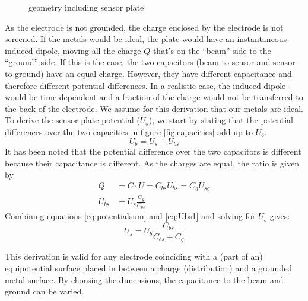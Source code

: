 \begin{figure}[ht]
\centering

\caption{geometry including sensor plate}
\label{fig:geofrontview}
\end{figure}

As the electrode is not grounded, the charge enclosed by the electrode is not screened. If the metals would be ideal, the plate would have an instantaneous induced dipole, moving all the charge $Q$ that's on the ``beam''-side to the ``ground'' side. If this is the case, the two capacitors (beam to sensor and sensor to ground) have an equal charge. However, they have different capacitance and therefore different potential differences.
In a realistic case, the induced dipole would be time-dependent and a fraction of the charge would not be transferred to the back of the electrode. We assume for this derivation that our metals are ideal.
To derive the sensor plate potential ($U_s$), we start by stating that the potential differences over the two capacities in figure \ref{fig:capacities} add up to $U_b$.
\begin{equation}
U_b = U_s + U_{bs}
\label{eq:potentialsum}
\end{equation}
It has been noted that the potential difference over the two capacitors is different because their capacitance is different. As the charges are equal, the ratio is given by
\begin{align}
Q &= C\cdot U = C_{bs} U_{bs} = C_g U_{sg} \nonumber \\
U_{bs} &= U_s\frac{C_g}{C_{bs}} \label{eq:Ubs1}
\end{align}
Combining equations \ref{eq:potentialsum} and \ref{eq:Ubs1} and solving for $U_s$ gives:
\begin{equation}
U_s = U_b \frac{C_{bs}}{C_{bs}+C_g}
\label{eq:vplatec}
\end{equation}

This derivation is valid for any electrode coinciding with a (part of an) equipotential surface placed in between a charge (distribution) and a grounded metal surface. By choosing the dimensions, the capacitance to the beam and ground can be varied.

